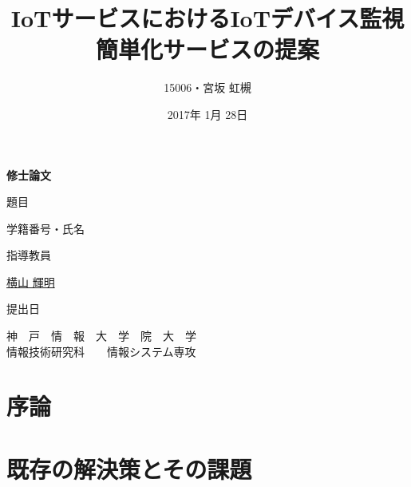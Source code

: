 \documentclass[a4paper]{jreport}
\begin{document}
\makeatletter

\title{IoTサービスにおけるIoTデバイス監視簡単化サービスの提案}
\author{15006・宮坂 虹槻}
\date{2017年 1月 28日}
\def\@teacher{横山 輝明}

\begin{titlepage}\begin{center}
\thispagestyle{plain}
{\Huge \textbf{修士論文} \par}
\vspace{1.5cm}
{\LARGE\gt 題目 \par}
{\LARGE\gt \underline{\@title} \par}
\vspace{2.5cm}
{\LARGE\gt 学籍番号・氏名 \par}
\vspace{1.5cm}
{\LARGE \underline{\@author} \par}
\vspace{1.5cm}
{\LARGE\gt 指導教員 \par}
\vspace{1.5cm}
{\LARGE\gt \underline{\@teacher} \par}
\vspace{1.5cm}
{\LARGE\gt 提出日 \par}
\vspace{1.5cm}
{\LARGE\gt \underline{\@date} \par}
\vspace{1.5cm}
{\Large\gt
神　戸　情　報　大　学　院　大　学\\
情報技術研究科　　情報システム専攻\\
\par}
\end{center}\end{titlepage}
\restoregeometry
\makeatother

\tableofcontents

\begin{abstract}
\thispagestyle{plain}

\end{abstract}

\chapter{序論}


\chapter{既存の解決策とその課題}

\end{document}
